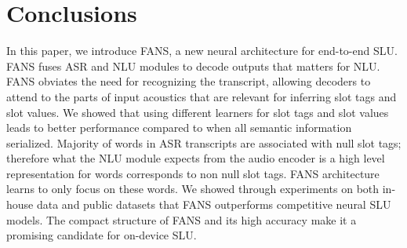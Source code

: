 \documentclass[a4paper]{article}
\begin{document}
\iffalse
As the results in Table 2 and 3 indicate the IRER for joint ASR NLU models is lower than the other models.  We conducted an experiment to  investigate impact of ASR error on the NLU outputs. Ideally, if we can get the transcript with no WER, the SLU system becomes an NLU where already the state of the art results reported using transformer based neural architectures (e.g. see \cite{wang2020encoding} and references therein). In our experiments, we injected synthetically generated error into the transcripts of the FSC data to resemble the WER introduced by  ASR in the  joint ASR-NLU SLU model and measured the slot tag errors. Figure~\ref{fig:WERNLU}) illustrates the slot tag error when WER increases from 0\% to 10\%.
We can see from the figure slot tag accuracy is very sensitive to ASR outputs even for FSC data for which we have three slot tags. This observation suggests that  the ASR-NLU SLU models require a reliable ASR module for which  increasing ASR model size and using more training data are two requirement which in turn introduce challenges in on-device SLU where we have limited computational resources and data.

\begin{figure}[t]
  \centering
  \texttt{[image: iFIG4.png]}
  \caption{ The impact of WER on slot tag error rate for ASR +NLU SLU architecture. The NLU output is very sensitive to ASR output. }
  \label{fig:WERNLU}
\end{figure}
\fi
\section{Conclusions}
In this paper, we introduce FANS, a new neural architecture for end-to-end SLU. FANS fuses ASR and NLU modules to decode outputs that matters for NLU. FANS obviates the need for recognizing the transcript, allowing decoders  to attend to the parts of input acoustics that are relevant for inferring slot tags and slot values.  We showed that using different learners for slot tags and slot values leads to better performance compared to when all semantic information serialized.  Majority of words in ASR transcripts are  associated with  null slot tags; therefore what the NLU module expects from the audio encoder is a high level representation for words corresponds to non null slot tags. FANS architecture learns to only focus on these words.  We showed through experiments on both in-house data and public datasets that FANS outperforms competitive neural SLU models. The compact structure of FANS and its high accuracy make it a promising candidate for on-device SLU.






\end{document}
